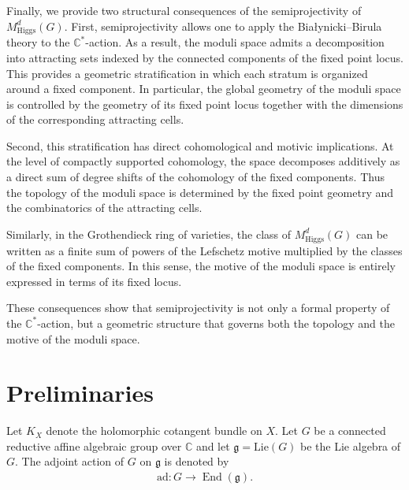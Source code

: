 \documentclass[11pt, reqno]{amsart}
\numberwithin{equation}{section}
\theoremstyle{definition}
\begin{document}
Finally, we provide two structural consequences of the semiprojectivity of $M^d_{\mathrm{Higgs}}(G)$. First, semiprojectivity allows one to apply the
Białynicki--Birula theory to the $\mathbb{C}^\ast$-action. As a result, the moduli space admits a decomposition into attracting sets indexed by the connected components of the fixed point locus. This provides a geometric stratification in which each stratum is organized around a fixed component. In particular, the global geometry of the moduli space is controlled by the geometry of its fixed point locus together with the dimensions of the corresponding attracting cells.

Second, this stratification has direct cohomological and motivic implications. At the level of compactly supported cohomology, the space decomposes additively as a direct sum of degree shifts of the cohomology of the fixed components. Thus the topology of the moduli space is determined by the
fixed point geometry and the combinatorics of the attracting
cells.

Similarly, in the Grothendieck ring of varieties,
the class of $M^d_{\mathrm{Higgs}}(G)$ can be written as a finite
sum of powers of the Lefschetz motive multiplied by the classes
of the fixed components.
In this sense, the motive of the moduli space is entirely
expressed in terms of its fixed locus.

These consequences show that semiprojectivity is not only a
formal property of the $\mathbb{C}^\ast$-action, but a geometric
structure that governs both the topology and the motive of the
moduli space.



	
 \section{Preliminaries}
	Let $K_X$ denote the holomorphic cotangent bundle on $X$. Let $G$ be a connected reductive affine algebraic group over $\mathbb{C}$ and let $\mathfrak{g}=\mathrm{Lie}(G)$ be the Lie algebra of $G$. The adjoint action of $G$ on $\mathfrak{g}$ is denoted by
	\begin{align*}
	    	\mathrm{ad} : G \longrightarrow \operatorname{End}(\mathfrak{g}).
      \end{align*}
\end{document}

